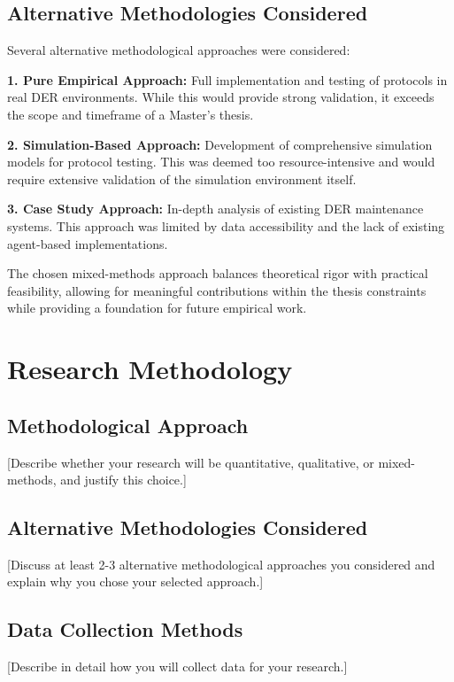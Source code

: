 \documentclass[12pt,a4paper]{article}
\begin{document}
\subsection{Alternative Methodologies Considered}

Several alternative methodological approaches were considered:

\textbf{1. Pure Empirical Approach:} Full implementation and testing of protocols in real DER environments. While this would provide strong validation, it exceeds the scope and timeframe of a Master's thesis.

\textbf{2. Simulation-Based Approach:} Development of comprehensive simulation models for protocol testing. This was deemed too resource-intensive and would require extensive validation of the simulation environment itself.

\textbf{3. Case Study Approach:} In-depth analysis of existing DER maintenance systems. This approach was limited by data accessibility and the lack of existing agent-based implementations.

The chosen mixed-methods approach balances theoretical rigor with practical feasibility, allowing for meaningful contributions within the thesis constraints while providing a foundation for future empirical work.

\section{Research Methodology}
\label{sec:methodology}

\subsection{Methodological Approach}
[Describe whether your research will be quantitative, qualitative, or mixed-methods, and justify this choice.]

\subsection{Alternative Methodologies Considered}
[Discuss at least 2-3 alternative methodological approaches you considered and explain why you chose your selected approach.]

\subsection{Data Collection Methods}
[Describe in detail how you will collect data for your research.]
\end{document}
